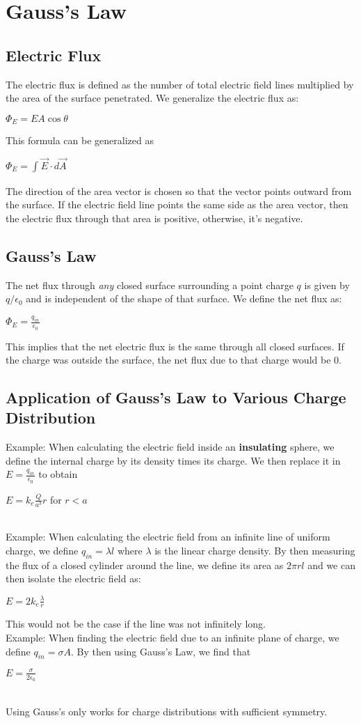 \documentclass[12pt]{report}
\begin{document}
\chapter{Gauss's Law}
	\section{Electric Flux}
		The electric flux is defined as the number of total electric field lines multiplied by the area of the surface penetrated. We generalize the electric flux as:\\
		\centerline{$\Phi_E = EA \cos \theta$}
		This formula can be generalized as \\
		\centerline{$\Phi_E = \int_{}^{} \vec{E} \cdot d\vec{A}$}
		The direction of the area vector is chosen so that the vector points outward from the surface. If the electric field line points the same side as the area vector, then the electric flux through that area is positive, otherwise, it's negative.
	\section{Gauss's Law}
		The net flux through \textit{any} closed surface surrounding a point charge $q$ is given by $q/\epsilon_0$ and is independent of the shape of that surface. We define the net flux as:\\
		\centerline{$\Phi_E = \frac{q_{in}}{\epsilon_0}$}
		This implies that the net electric flux is the same through all closed surfaces. If the charge was outside the surface, the net flux due to that charge would be 0.
	\section{Application of Gauss's Law to Various Charge Distribution}
		Example: When calculating the electric field inside an \textbf{insulating }sphere, we define the internal charge by its density times its charge. We then replace it in $E = \frac{q_{in}}{\epsilon_0}$ to obtain\\
		\centerline{$E = k_e \frac{Q}{a^3}r$ for $r<a$}
		\\
		Example: When calculating the electric field from an infinite line of uniform charge, we define $q_{in}=\lambda l$ where $\lambda$ is the linear charge density. By then measuring the flux of a closed cylinder around the line, we define its area as $2\pi rl$ and we can then isolate the electric field as:\\
		\centerline{$E = 2k_e \frac{\lambda}{r}$}
		This would not be the case if the line was not infinitely long.\\
		Example: When finding the electric field due to an infinite plane of charge, we define $q_{in} = \sigma A$. By then using Gauss's Law, we find that \\
		\centerline{$E = \frac{\sigma}{2\epsilon_0}$}
		\\
		Using Gauss's only works for charge distributions with sufficient symmetry.
\end{document}

